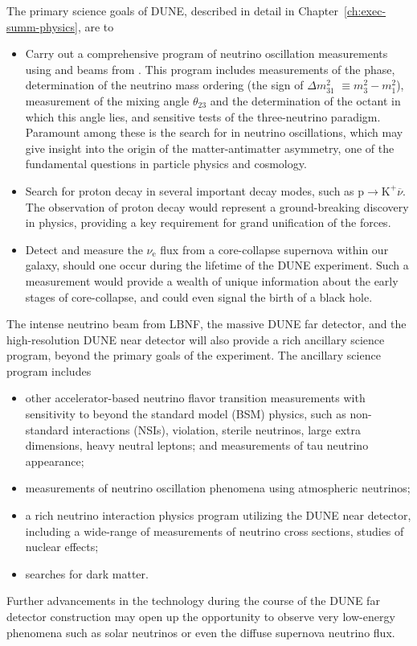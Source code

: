 The primary science goals of DUNE, described in detail in Chapter~\ref{ch:exec-summ-physics}, are to
\begin{itemize}

\item Carry out a comprehensive program of neutrino oscillation measurements using \numu and \anumu beams from \fnal. This program includes measurements of the  phase, determination of the neutrino mass ordering (the sign of $\Delta m^2_{31} $
$ \equiv m_3^2-m_1^2$), measurement of the mixing angle $\theta_{23}$ and the determination of the octant in which this angle lies,
and sensitive tests of the three-neutrino paradigm. Paramount among these is the search for  in neutrino oscillations, which may give insight into the origin of the matter-antimatter asymmetry, one of the fundamental questions in particle physics and cosmology. 

\item Search for proton decay in several important decay modes, such as $\text{p}\rightarrow\text{K}^+\overline{\nu}$. The observation of proton decay would represent a ground-breaking discovery in physics, providing a key requirement for grand unification of the forces. 

    \item Detect and measure the $\nu_\text{e}$ flux from a core-collapse supernova within our galaxy, should one occur during the lifetime of the DUNE experiment. Such a measurement would provide a wealth of unique information about the early stages of core-collapse, and could even signal the birth of a black hole.
    
\end{itemize}

The intense neutrino beam from LBNF, the massive DUNE \lartpc far detector, and the high-resolution
DUNE near detector will also provide a rich ancillary science program, beyond the primary goals of the experiment. The ancillary science program includes
\begin{itemize}
     \item other accelerator-based neutrino flavor transition measurements with sensitivity to beyond the standard model (BSM) physics, such as non-standard interactions (NSIs),  violation, sterile neutrinos, large extra dimensions, heavy neutral leptons;
 and measurements of tau neutrino appearance;
     \item measurements of neutrino oscillation phenomena using atmospheric neutrinos;
     \item a rich neutrino interaction physics program utilizing the DUNE near detector, including a wide-range of measurements of neutrino cross sections, studies of nuclear effects; %
     \item  searches for dark matter.
\end{itemize} 
Further advancements in the \lartpc %
technology during the course of the DUNE far detector construction may open up the opportunity
to observe very low-energy phenomena such as solar neutrinos or even the diffuse supernova neutrino flux.


